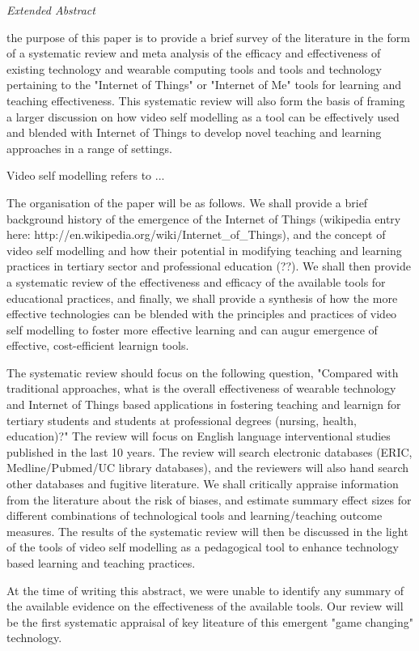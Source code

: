 \textit{Extended Abstract} 

the purpose of this paper is to provide a brief survey of the literature in the form of a systematic review and meta analysis of the efficacy and effectiveness of existing technology and wearable computing tools and tools and technology pertaining to the "Internet of Things" or "Internet of Me" tools for learning and teaching effectiveness. This systematic review will also form the basis of framing a larger discussion on how video self modelling as a tool can be effectively used and blended with Internet of Things to develop novel teaching and learning approaches in a range of settings. 

Video self modelling refers to ... 

The organisation of the paper will be as follows. We shall provide a brief background history of the emergence of the Internet of Things (wikipedia entry here: http://en.wikipedia.org/wiki/Internet_of_Things), and the concept of video self modelling and how their potential in modifying teaching and learning practices in tertiary sector and professional education (??). We shall then provide a systematic review of the effectiveness and efficacy of the available tools for educational practices, and finally, we shall provide a synthesis of how the more effective technologies can be blended with the principles and practices of video self modelling to foster more effective learning and can augur emergence of effective, cost-efficient learnign tools.

The systematic review should focus on the following question, "Compared with traditional approaches, what is the overall effectiveness of wearable technology and Internet of Things based applications in fostering teaching and learnign for tertiary students and students at professional degrees (nursing, health, education)?" The review will focus on English language interventional studies published in the last 10 years. The review will search electronic databases (ERIC, Medline/Pubmed/UC library databases), and the reviewers will also hand search other databases and fugitive literature. We shall critically appraise information from the literature about the risk of biases, and estimate summary effect sizes for different combinations of technological tools and learning/teaching outcome measures. The results of the systematic review will then be discussed in the light of the tools of video self modelling as a pedagogical tool to enhance technology based learning and teaching practices. 

At the time of writing this abstract, we were unable to identify any summary of the available evidence on the effectiveness of the available tools. Our review will be the first systematic appraisal of key liteature of this emergent "game changing" technology. 
